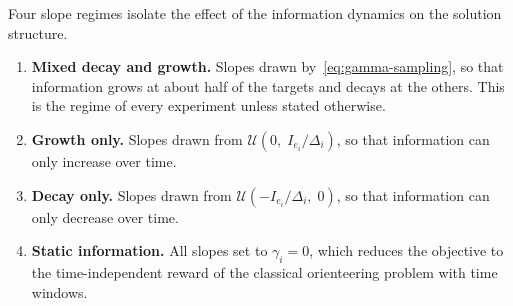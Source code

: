 Four slope regimes isolate the effect of the information dynamics on the solution structure.
\begin{enumerate}
    \item \textbf{Mixed decay and growth.} Slopes drawn by~\eqref{eq:gamma-sampling}, so that information grows at about half of the targets and decays at the others. This is the regime of every experiment unless stated otherwise.
    \item \textbf{Growth only.} Slopes drawn from $\mathcal{U}(0,\; I_{e_i}/\Delta_i)$, so that information can only increase over time.
    \item \textbf{Decay only.} Slopes drawn from $\mathcal{U}(-I_{e_i}/\Delta_i,\; 0)$, so that information can only decrease over time.
    \item \textbf{Static information.} All slopes set to $\gamma_i = 0$, which reduces the objective to the time-independent reward of the classical orienteering problem with time windows.
\end{enumerate}


